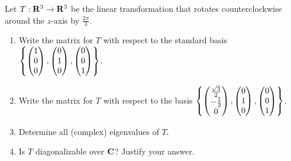 \documentclass[10pt,twoside,openany]{memoir}
\begin{document}
\begin{problem}[F19, P2]
    Let $T:\mathbf{R}^3 \rightarrow \mathbf{R}^3$ be the linear transformation that rotates counterclockwise around the $z$-axis by $\frac{2\pi}{3}$. 
    \begin{enumerate}[label = (\alph*),itemsep=1pt,topsep=3pt]
        \item Write the matrix for $T$ with respect to the standard basis $\left\{ \left( \begin{matrix} 1 \\ 0 \\ 0 \end{matrix} \right), \left( \begin{matrix} 0 \\ 1 \\ 0 \end{matrix} \right),\left( \begin{matrix} 0 \\ 0 \\ 1 \end{matrix} \right) \right\}$.
        \item Write the matrix for $T$ with respect to the basis $\left\{ \left( \begin{matrix} \frac{\sqrt{3}}{2} \\ -\frac{1}{2} \\ 0 \end{matrix} \right), \left( \begin{matrix} 0 \\ 1 \\ 0 \end{matrix} \right),\left( \begin{matrix} 0 \\ 0 \\ 1 \end{matrix} \right) \right\}$.
        \item Determine all (complex) eigenvalues of $T$.
        \item Is $T$ diagonalizable over $\mathbf{C}$? Justify your answer.
    \end{enumerate}
\end{problem}
\end{document}
